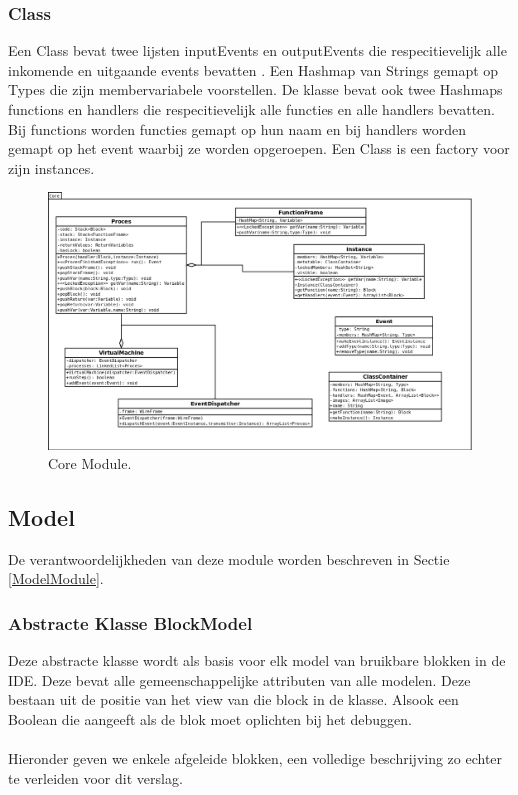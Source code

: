 \documentclass[]{article}
\begin{document}
\subsubsection{Class}
Een Class bevat twee lijsten inputEvents en outputEvents die respecitievelijk alle inkomende en uitgaande events bevatten \cite{arraylist}. Een Hashmap van Strings gemapt op Types die zijn membervariabele voorstellen. De klasse bevat ook twee Hashmaps \cite{hashmap} functions en handlers die respecitievelijk  alle functies en alle handlers bevatten. Bij functions worden functies gemapt op hun naam en bij handlers worden gemapt op het event waarbij ze worden opgeroepen. Een Class is een factory voor zijn instances.

\clearpage
 \begin{figure}
  \centering
   
\includegraphics[scale=0.8]{./AnalyseClassenDiagram/core.png}
  \caption{Core Module.} \label{coreUML}
\end{figure}
\clearpage

\subsection{Model}
De verantwoordelijkheden van deze module worden beschreven in Sectie \ref{ModelModule}.
\subsubsection{Abstracte Klasse BlockModel}
\label{ModelBlock}
Deze abstracte klasse wordt als basis voor elk model van bruikbare blokken in de IDE. Deze bevat alle gemeenschappelijke attributen van alle modelen. Deze bestaan uit de positie van het view van die block in de klasse. Alsook een Boolean die aangeeft als de blok moet oplichten bij het debuggen.\\\\ Hieronder geven we enkele afgeleide blokken, een volledige beschrijving zo echter te verleiden voor dit verslag.
\end{document}
